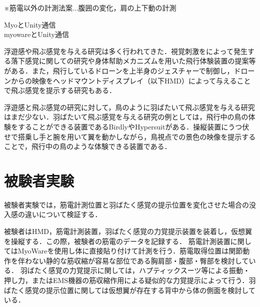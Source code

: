 ※筋電以外の計測法案...腹囲の変化，肩の上下動の計測





        MyoとUnity通信\\    
        myowareとUnity通信\\



        浮遊感や飛ぶ感覚を与える研究は多く行われてきた．視覚刺激をによって発生する落下感覚に関しての研究\cite{奥川夏輝2017VR空間における視覚刺激によって発生する落下感覚の分析}や身体幇助メカニズムを用いた飛行体験装置の提案\cite{鈴木拓馬2014hmd}等がある．また，飛行しているドローンを上半身のジェスチャーで制御し，ドローンからの映像をヘッドマウントディスプレイ（以下HMD）によって与えることで飛ぶ感覚を提示する研究\cite{rognon2018flyjacket}もある．

        浮遊感と飛ぶ感覚の研究に対して，鳥のように羽ばたいて飛ぶ感覚を与える研究はまだ少ない．羽ばたいて飛ぶ感覚を与える研究の例としては，飛行中の鳥の体験をすることができる装置であるBirdly\cite{rheiner2014birdly}やHypersuit\cite{hypersuit}がある．操縦装置にうつ伏せで搭乗し手と腕を用いて翼を動かしながら，鳥視点での景色の映像を提示することで，飛行中の鳥のような体験できる装置である．


        \section{被験者実験}
        
        被験者実験では，筋電計測位置と羽ばたく感覚の提示位置を変化させた場合の没入感の違いについて検証する．
        
        被験者はHMD，筋電計測装置，羽ばたく感覚の力覚提示装置を装着し，仮想翼を操縦する．この際，被験者の筋電のデータを記録する．
        筋電計測装置に関してはMyoWareを使用し体に直接貼り付けて計測を行う．筋電取得位置は関節動作を伴わない静的な筋収縮が容易な部位である胸肩部・腹部・臀部を検討している．
        羽ばたく感覚の力覚提示に関しては，ハプティックスーツ等による振動・押し力，またはEMS機器の筋収縮作用による疑似的な力覚提示によって行う．羽ばたく感覚の提示位置に関しては仮想翼が存在する背中から体の側面を検討している．
        
